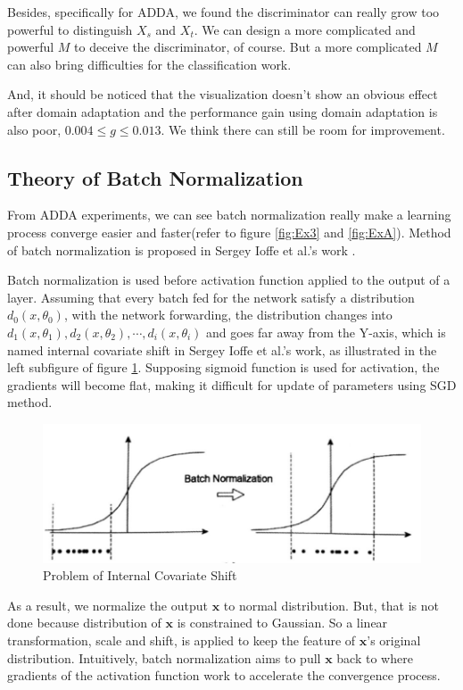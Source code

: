 \documentclass[conference]{IEEEtran}
\begin{document}
Besides, specifically for ADDA, we found the discriminator can really grow too powerful to distinguish $X_s$ and $X_t$. We can design a more complicated and powerful $M$ to deceive the discriminator, of course. But a more complicated $M$ can also bring difficulties for the classification work.

And, it should be noticed that the visualization doesn't show an obvious effect after domain adaptation and the performance gain using domain adaptation is also poor, $0.004 \leq g \leq 0.013$. We think there can still be room for improvement.

\subsection{Theory of Batch Normalization}
From ADDA experiments, we can see batch normalization really make a learning process converge easier and faster(refer to figure \ref{fig:Ex3} and \ref{fig:ExA}). Method of batch normalization is proposed in Sergey Ioffe et al.'s work \cite{BN1}.

Batch normalization is used before activation function applied to the output of a layer. Assuming that every batch fed for the network satisfy a distribution $d_0(x, \theta_0)$, with the network forwarding, the distribution changes into $d_1(x, \theta_1), d_2(x, \theta_2), \cdots, d_i(x, \theta_i)$ and goes far away from the Y-axis, which is named internal covariate shift in Sergey Ioffe et al.'s work\cite{BN1}, as illustrated in the left subfigure of figure \ref{fig:BN_theorem1}. Supposing sigmoid function is used for activation, the gradients will become flat, making it difficult for update of parameters using SGD method.
\begin{figure}
  \centering
  \includegraphics[width=.4\textwidth]{LBN_theorem1.jpg}
  \caption{Problem of Internal Covariate Shift}
  \label{fig:BN_theorem1}
\end{figure}
As a result, we normalize the output $\mathbf{x}$ to normal distribution. But, that is not done because distribution of $\mathbf{x}$ is constrained to Gaussian. So a linear transformation, scale and shift, is applied to keep the feature of $\mathbf{x}$'s original distribution. Intuitively, batch normalization aims to pull $\mathbf{x}$ back to where gradients of the activation function work to accelerate the convergence process.
\end{document}
